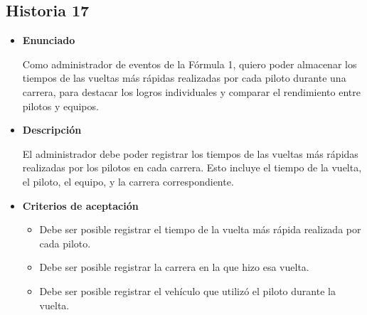 \documentclass{article}
\begin{document}
	\subsection{Historia 17}
	\begin{itemize}
		
		\item \large{\textbf{Enunciado}}
		\begin{description}
			Como administrador de eventos de la Fórmula 1, quiero poder almacenar los tiempos de las vueltas más rápidas realizadas por cada piloto durante una carrera, para destacar los logros individuales y comparar el rendimiento entre pilotos y equipos.

		\end{description}
		
		\item \large{\textbf{Descripción}}
		\begin{description}
			El administrador debe poder registrar los tiempos de las vueltas más rápidas realizadas por los pilotos en cada carrera. Esto incluye el tiempo de la vuelta, el piloto, el equipo, y la carrera correspondiente.

		\end{description}
		
		\item \large{\textbf{Criterios de aceptación}}
		\begin{itemize}
			\item Debe ser posible registrar el tiempo de la vuelta más rápida realizada por cada piloto. 
			\item Debe ser posible registrar la carrera en la que hizo esa vuelta.
			\item Debe ser posible registrar el vehículo que utilizó el piloto durante la vuelta.
			
		\end{itemize}
		
	\end{itemize}
	
\end{document}
